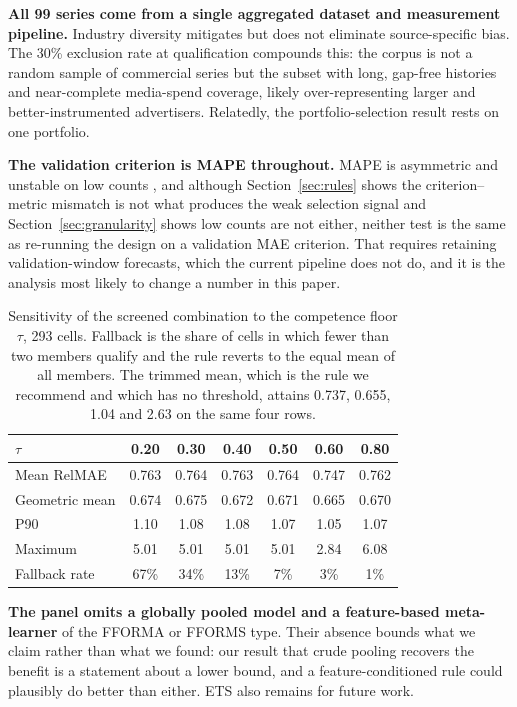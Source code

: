 \documentclass[11pt]{article}
\begin{document}
\textbf{All 99 series come from a single aggregated dataset and measurement pipeline.} Industry diversity mitigates but does not eliminate source-specific bias. The 30\% exclusion rate at qualification compounds this: the corpus is not a random sample of commercial series but the subset with long, gap-free histories and near-complete media-spend coverage, likely over-representing larger and better-instrumented advertisers. Relatedly, the portfolio-selection result rests on one portfolio.

\textbf{The validation criterion is MAPE throughout.} MAPE is asymmetric and unstable on low counts \citep{kolassa2016}, and although Section~\ref{sec:rules} shows the criterion--metric mismatch is not what produces the weak selection signal and Section~\ref{sec:granularity} shows low counts are not either, neither test is the same as re-running the design on a validation MAE criterion. That requires retaining validation-window forecasts, which the current pipeline does not do, and it is the analysis most likely to change a number in this paper.

\begin{table}[htbp]\centering\small
\caption{Sensitivity of the screened combination to the competence floor $\tau$, 293 cells. Fallback is the share of cells in which fewer than two members qualify and the rule reverts to the equal mean of all members. The trimmed mean, which is the rule we recommend and which has no threshold, attains 0.737, 0.655, 1.04 and 2.63 on the same four rows.}
\label{tab:tau}
\begin{tabular}{lcccccc}
\toprule
$\tau$ & 0.20 & 0.30 & 0.40 & 0.50 & 0.60 & 0.80 \\
\midrule
Mean RelMAE & 0.763 & 0.764 & 0.763 & 0.764 & 0.747 & 0.762 \\
Geometric mean & 0.674 & 0.675 & 0.672 & 0.671 & 0.665 & 0.670 \\
P90 & 1.10 & 1.08 & 1.08 & 1.07 & 1.05 & 1.07 \\
Maximum & 5.01 & 5.01 & 5.01 & 5.01 & 2.84 & 6.08 \\
Fallback rate & 67\% & 34\% & 13\% & 7\% & 3\% & 1\% \\
\bottomrule
\end{tabular}
\end{table}

\textbf{The panel omits a globally pooled model and a feature-based meta-learner} of the FFORMA or FFORMS type. Their absence bounds what we claim rather than what we found: our result that crude pooling recovers the benefit is a statement about a lower bound, and a feature-conditioned rule could plausibly do better than either. ETS also remains for future work.
\end{document}
